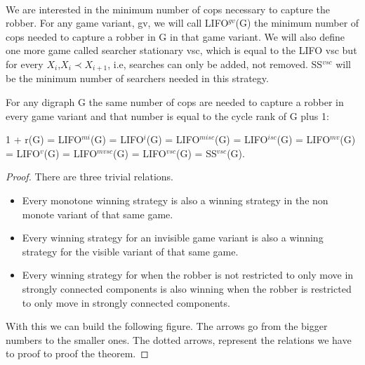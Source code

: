 \paragraph{}
We are interested in the minimum number of cops necessary to capture the robber. For any game variant, gv, we will call LIFO$^{gv}$(G) the minimum number of cops needed to capture a robber in G in that game variant. We will also define one more game called searcher stationary vsc, which is equal to the LIFO vsc but for every $X_i$,$X_i \prec X_{i+1}$, i.e, searches can only be added, not removed. SS$^{vsc}$ will be the minimum number of searchers needed in this strategy.

\begin{theorem}
For any digraph G the same number of cops are needed to capture a robber in every game variant and that number is equal to the cycle rank of G plus 1:

1 + r(G) = LIFO$^{mi}$(G) = LIFO$^{i}$(G) = LIFO$^{misc}$(G) = LIFO$^{isc}$(G) = LIFO$^{mv}$(G) = LIFO$^{v}$(G) = LIFO$^{mvsc}$(G) = LIFO$^{vsc}$(G) = SS$^{vsc}$(G).
\end{theorem}
\begin{proof}
There are three trivial relations.
\begin{itemize}
\item Every monotone winning strategy is also a winning strategy in the non monote variant of that same game.
\item Every winning strategy for an invisible game variant is also a winning strategy for the visible variant of that same game.
\item Every winning strategy for when the robber is not restricted to only move in strongly connected components is also winning when the robber is restricted to only move in strongly connected components.
\end{itemize}
With this we can build the following figure. The arrows go from the bigger numbers to the smaller ones. The dotted arrows, represent the relations we have to proof to proof the theorem.
\end{proof}

